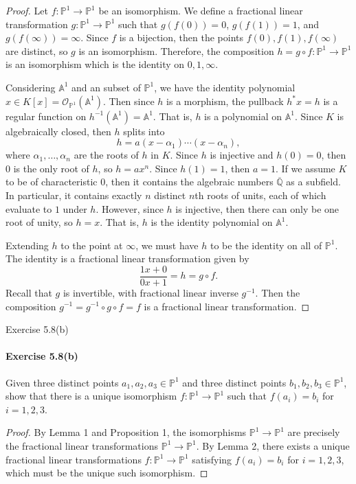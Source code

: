 \documentclass[12pt]{article}
\newenvironment{fullbox}{\begin{lrbox}{\savefullbox}\begin{minipage}{\dimexpr\textwidth-2\fboxsep\relax}}{\end{minipage}\end{lrbox}\begin{center}\framebox[\textwidth]{\usebox{\savefullbox}}\end{center}}
\newenvironment{pbox}[1][]{\begin{fullbox}\ifx#1\empty\else\paragraph{#1}\fi}{\end{fullbox}}
\theoremstyle{definition}
\newcommand{\Q}{\mathbb{Q}}
\newcommand{\A}{\mathbb{A}}
\renewcommand{\P}{\mathbb{P}}
\newcommand{\<}{\langle}
\renewcommand{\>}{\rangle}
\renewcommand{\O}{\mathscr{O}}
\newcommand{\clo}{\overline}
\begin{document}
\begin{proof}
    Let $f : \P^1 \to \P^1$ be an isomorphism. We define a fractional linear transformation $g : \P^1 \to \P^1$ such that $g(f(0)) = 0$, $g(f(1)) = 1$, and $g(f(\infty)) = \infty$. Since $f$ is a bijection, then the points $f(0), f(1), f(\infty)$ are distinct, so $g$ is an isomorphism. Therefore, the composition $h = g \circ f : \P^1 \to \P^1$ is an isomorphism which is the identity on $0, 1, \infty$.

    Considering $\A^1$ and an subset of $\P^1$, we have the identity polynomial $x \in K[x] = \O_{\P^1}(\A^1)$. Then since $h$ is a morphism, the pullback $h^*x = h$ is a regular function on $h^{-1}(\A^1) = \A^1$. That is, $h$ is a polynomial on $\A^1$. Since $K$ is algebraically closed, then $h$ splits into
    \[
        h = a(x - \alpha_1) \cdots (x - \alpha_n),
    \]
    where $\alpha_1, \dots, \alpha_n$ are the roots of $h$ in $K$. Since $h$ is injective and $h(0) = 0$, then $0$ is the only root of $h$, so $h = ax^n$. Since $h(1) = 1$, then $a = 1$. If we assume $K$ to be of characteristic $0$, then it contains the algebraic numbers $\clo{\Q}$ as a subfield. In particular, it contains exactly $n$ distinct $n$th roots of units, each of which evaluate to $1$ under $h$. However, since $h$ is injective, then there can only be one root of unity, so $h = x$. That is, $h$ is the identity polynomial on $\A^1$.

    Extending $h$ to the point at $\infty$, we must have $h$ to be the identity on all of $\P^1$. The identity is a fractional linear transformation given by
    \[
        \frac{1x + 0}{0x + 1} = h = g \circ f.
    \]
    Recall that $g$ is invertible, with fractional linear inverse $g^{-1}$. Then the composition $g^{-1} = g^{-1} \circ g \circ f = f$ is a fractional linear transformation. 

\end{proof}


\newpage
\begin{pbox}[Exercise 5.8(b)]
    Given three distinct points $a_1, a_2, a_3 \in \P^1$ and three distinct points $b_1, b_2, b_3 \in \P^1$, show that there is a unique isomorphism $f : \P^1 \to \P^1$ such that $f(a_i) = b_i$ for $i = 1, 2, 3$. 
\end{pbox}

\begin{proof}
    By Lemma 1 and Proposition 1, the isomorphisms $\P^1 \to \P^1$ are precisely the fractional linear transformations $\P^1 \to \P^1$. By Lemma 2, there exists a unique fractional linear transformations $f : \P^1 \to \P^1$ satisfying $f(a_i) = b_i$ for $i = 1, 2, 3$, which must be the unique such isomorphism.

\end{proof}
\end{document}
